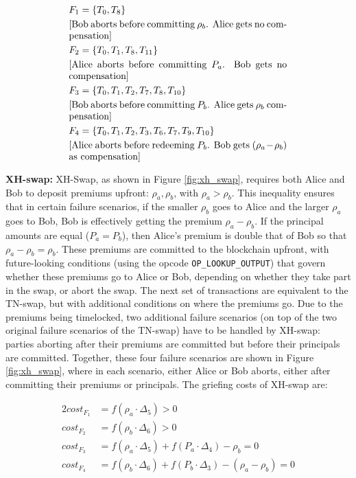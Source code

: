 \begin{figure}[hbt!]
\begin{align*}
    &F_1 = \{T_0, T_8\} \\
    &\text{\parbox{8cm}{[Bob aborts before committing $\rho_b$. Alice gets no compensation]}} \\
    &F_2 = \{T_0, T_1, T_8, T_{11}\} \\ 
    &\text{\parbox{8cm}{[Alice aborts before committing $P_a$. Bob gets no compensation]}} \\
    &F_3 = \{T_0, T_1, T_2, T_7, T_8, T_{10}\} \\ 
    &\text{\parbox{8cm}{[Bob aborts before committing $P_b$. Alice gets $\rho_b$ compensation]}} \\
    &F_4 = \{T_0, T_1, T_2, T_3, T_6, T_7, T_9, T_{10}\}\\
    &\text{\parbox{8cm}{[Alice aborts before redeeming $P_b$. Bob gets $(\rho_a-\rho_b)$ as compensation]}}
\end{align*}
\end{figure}

\bigskip
\noindent
\textbf{XH-swap:} XH-Swap, as shown in Figure \ref{fig:xh_swap}, requires both Alice and Bob to deposit premiums upfront: $\rho_a, \rho_b$, with $\rho_a > \rho_b$. This inequality ensures that in certain failure scenarios, if the smaller $\rho_b$ goes to Alice and the larger $\rho_a$ goes to Bob, Bob is effectively getting the premium $\rho_a-\rho_b$. If the principal amounts are equal ($P_a = P_b$), then Alice's premium is double that of Bob so that $\rho_a - \rho_b = \rho_b$. These premiums are committed to the blockchain upfront, with future-looking conditions (using the opcode \texttt{OP\_LOOKUP\_OUTPUT}) that govern whether these premiums go to Alice or Bob, depending on whether they take part in the swap, or abort the swap. The next set of transactions are equivalent to the TN-swap, but with additional conditions on where the premiums go. Due to the premiums being timelocked, two additional failure scenarios (on top of the two original failure scenarios of the TN-swap) have to be handled by XH-swap: parties aborting after their premiums are committed but before their principals are committed. Together, these four failure scenarios are shown in Figure \ref{fig:xh_swap}, where in each scenario, either Alice or Bob aborts, either after committing their premiums or principals. The griefing costs of XH-swap are:

\begin{alignat}{2}
    cost_{F_1} &= f(\rho_a\cdot\Delta_5) > 0 \label{eq:xh_cost_1}\\
    cost_{F_2} &= f(\rho_b\cdot\Delta_6) > 0 \label{eq:xh_cost_2}\\
    cost_{F_3} &= f(\rho_a\cdot\Delta_5) + f(P_a\cdot\Delta_4) - \rho_b = 0 \label{eq:xh_cost_3}\\
    cost_{F_4} &= f(\rho_b\cdot\Delta_6) + f(P_b\cdot\Delta_3) - (\rho_a - \rho_b) =0 \label{eq:xh_cost_4}
\end{alignat}

